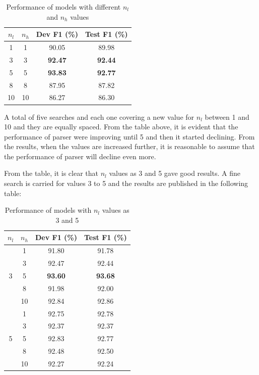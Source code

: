 \documentclass[a4paper, 11pt]{article}
\begin{document}
\begin{table}[h!]
  \begin{center}
    \label{tab:coarse_search_for_layers_heads}
    \def\arraystretch{1.5}%
    \begin{tabular}{c|c|c|c}
      \textbf{$n_l$} & \textbf{$n_h$} & Dev F1 (\%) & Test F1 (\%) \\
      \hline
      1 & 1 & 90.05 & 89.98\\
      3 & 3 & \textbf{92.47} & \textbf{92.44}\\
      5 & 5 & \textbf{93.83} & \textbf{92.77}\\
      8 & 8 & 87.95 & 87.82\\
      10 & 10 & 86.27 & 86.30\\
    \end{tabular}
    \caption{Performance of models with different $n_l$ and $n_h$ values}
  \end{center}
\end{table}

A total of five searches and each one covering a new value for $n_l$ between 1 and 10 and they are equally spaced. From the table above, it is evident that the performance of parser were improving until 5 and then it started declining. From the results, when the values are increased further, it is reasonable to assume that the performance of parser will decline even more. 

From the table, it is clear that $n_l$ values as 3 and 5 gave good results. A fine search is carried for values 3 to 5 and the results are published in the following table:

\begin{table}[h!]
  \begin{center}
  \def\arraystretch{1.5}%

    \label{tab:fine_search_for_layers_heads}
    \begin{tabular}{c|c|c|c}
      \textbf{$n_l$} & \textbf{$n_h$} & Dev F1 (\%) & Test F1 (\%) \\
      \hline
      \multirow{5}{*}{3} & 1 & 91.80 & 91.78\\
	  & 3 & 92.47 & 92.44\\
	  & 5 & \textbf{93.60} & \textbf{93.68}\\
	  & 8 & 91.98 & 92.00\\
	  & 10 & 92.84 & 92.86\\
	  \hline
      \multirow{5}{*}{5} & 1 & 92.75 & 92.78\\
	  & 3 & 92.37 & 92.37\\
	  & 5 & 92.83 & 92.77\\
	  & 8 & 92.48 & 92.50\\
	  & 10 & 92.27 & 92.24\\
    \end{tabular}
    \caption{Performance of models with $n_l$ values as 3 and 5}
  \end{center}
\end{table}
\end{document}
